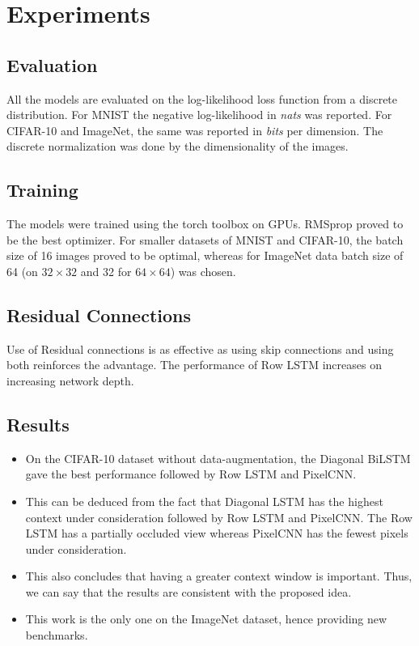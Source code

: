 \documentclass{article}
\begin{document}
\section{Experiments}

\subsection{Evaluation}
All the models are evaluated on the log-likelihood loss function from a discrete distribution. For MNIST the negative log-likelihood in \textit{nats} was reported. For CIFAR-10 and ImageNet, the same was reported in \textit{bits} per dimension. The discrete normalization was done by the dimensionality of the images.

\subsection{Training}
The models were trained using the torch toolbox on GPUs. RMSprop proved to be the best optimizer. For smaller datasets of MNIST and CIFAR-10, the batch size of 16 images proved to be optimal, whereas for ImageNet data batch size of 64 (on $ 32 \times 32 $ and 32 for $ 64 \times 64 $) was chosen.

\subsection{Residual Connections}
Use of Residual connections is as effective as using skip connections and using both reinforces the advantage. The performance of Row LSTM increases on increasing network depth.

\subsection{Results}
\begin{itemize}
	\item On the CIFAR-10 dataset without data-augmentation, the Diagonal BiLSTM gave the best performance followed by Row LSTM and PixelCNN.
	\item This can be deduced from the fact that Diagonal LSTM has the highest context under consideration followed by Row LSTM and PixelCNN. The Row LSTM has a partially occluded view whereas PixelCNN has the fewest pixels under consideration.
	\item This also concludes that having a greater context window is important. Thus, we can say that the results are consistent with the proposed idea.
	\item This work is the only one on the ImageNet dataset, hence providing new benchmarks.
\end{itemize}
\end{document}
